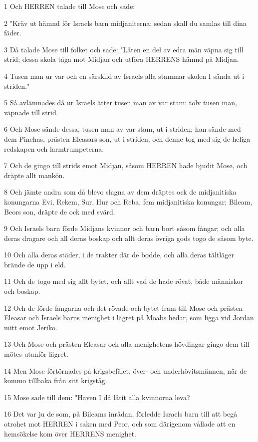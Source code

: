 \par 1 Och HERREN talade till Mose och sade:
\par 2 "Kräv ut hämnd för Israels barn midjaniterna; sedan skall du samlas till dina fäder.
\par 3 Då talade Mose till folket och sade: "Låten en del av edra män väpna sig till strid; dessa skola tåga mot Midjan och utföra HERRENS hämnd på Midjan.
\par 4 Tusen man ur var och en särskild av Israels alla stammar skolen I sända ut i striden."
\par 5 Så avlämnades då ur Israels ätter tusen man av var stam: tolv tusen man, väpnade till strid.
\par 6 Och Mose sände dessa, tusen man av var stam, ut i striden; han sände med dem Pinehas, prästen Eleasars son, ut i striden, och denne tog med sig de heliga redskapen och larmtrumpeterna.
\par 7 Och de gingo till strids emot Midjan, såsom HERREN hade bjudit Mose, och dräpte allt mankön.
\par 8 Och jämte andra som då blevo slagna av dem dräptes ock de midjanitiska konungarna Evi, Rekem, Sur, Hur och Reba, fem midjanitiska konungar; Bileam, Beors son, dräpte de ock med svärd.
\par 9 Och Israels barn förde Midjans kvinnor och barn bort såsom fångar; och alla deras dragare och all deras boskap och allt deras övriga gods togo de såsom byte.
\par 10 Och alla deras städer, i de trakter där de bodde, och alla deras tältläger brände de upp i eld.
\par 11 Och de togo med sig allt bytet, och allt vad de hade rövat, både människor och boskap.
\par 12 Och de förde fångarna och det rövade och bytet fram till Mose och prästen Eleasar och Israels barns menighet i lägret på Moabs hedar, som ligga vid Jordan mitt emot Jeriko.
\par 13 Och Mose och prästen Eleasar och alla menighetens hövdingar gingo dem till mötes utanför lägret.
\par 14 Men Mose förtörnades på krigsbefälet, över- och underhövitsmännen, när de kommo tillbaka från sitt krigståg.
\par 15 Mose sade till dem: "Haven I då låtit alla kvinnorna leva?
\par 16 Det var ju de som, på Bileams inrådan, förledde Israels barn till att begå otrohet mot HERREN i saken med Peor, och som därigenom vållade att en hemsökelse kom över HERRENS menighet.

